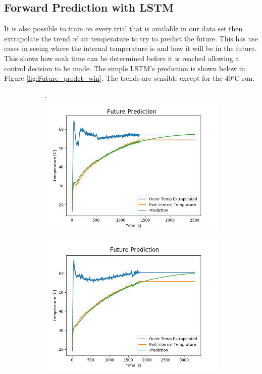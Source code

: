 \subsection{Forward Prediction with LSTM}
It is also possible to train on every trial that is available in our data set then extrapolate the trend of air temperature to try to predict the future. This has use cases in seeing where the internal temperature is and how it will be in the future. This shows how soak time can be determined before it is reached allowing a control decision to be made. The simple LSTM’s prediction is shown below in Figure \ref{fig:Future_predct_win}. The trends are sensible except for the 40$^\circ$C run.
\begin{figure}[ht]
    \begin{subfigure}{.33\linewidth}.
        \centering
    	\includegraphics[width=\linewidth]{lstm/predict_f_w2.png}
    \end{subfigure}
    \begin{subfigure}{.34\linewidth}
    	\centering
    	\includegraphics[width=\linewidth]{lstm/future_predict2.png}

\end{subfigure}
\end{figure}
